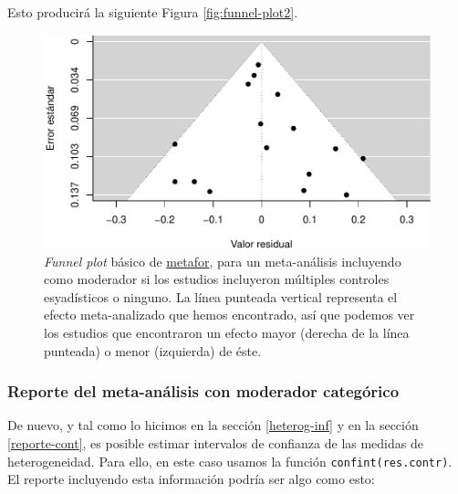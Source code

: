 \documentclass[
  bookmarksnumbered]{article}
\begin{document}
Esto producirá la siguiente Figura \ref{fig:funnel-plot2}.

\begin{figure}
\centering
\includegraphics{Meta-analysis_files/figure-latex/funnel-plot-mod2-1.pdf}
\caption{\label{fig:funnel-plot-mod2}\emph{Funnel plot} básico de \href{https://www.metafor-project.org/doku.php}{metafor}, para un meta-análisis incluyendo como moderador si los estudios incluyeron múltiples controles esyadísticos o ninguno. La línea punteada vertical representa el efecto meta-analizado que hemos encontrado, así que podemos ver los estudios que encontraron un efecto mayor (derecha de la línea punteada) o menor (izquierda) de éste.}
\end{figure}

\hypertarget{reporte-cat}{%
\subsubsection{Reporte del meta-análisis con moderador categórico}\label{reporte-cat}}

De nuevo, y tal como lo hicimos en la sección \ref{heterog-inf} y en la sección \ref{reporte-cont}, es posible estimar intervalos de confianza de las medidas de heterogeneidad. Para ello, en este caso usamos la función \texttt{confint(res.contr)}. El reporte incluyendo esta información podría ser algo como esto:
\end{document}
